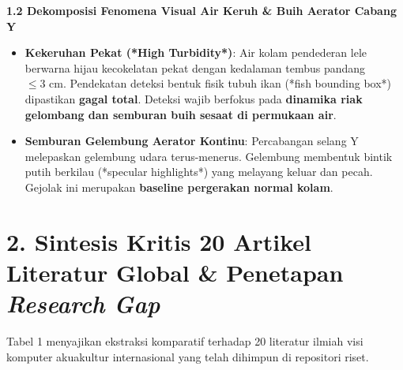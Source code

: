\documentclass[10pt,a4paper]{article}
\providecommand{\text}[1]{\mbox{#1}}
\begin{document}
\textbf{1.2 Dekomposisi Fenomena Visual Air Keruh \& Buih Aerator Cabang Y}
\begin{itemize}\setlength{\itemsep}{0.5pt}\setlength{\parskip}{0pt}
    \item \textbf{Kekeruhan Pekat (*High Turbidity*)}: Air kolam pendederan lele berwarna hijau kecokelatan pekat dengan kedalaman tembus pandang $\le 3\text{ cm}$. Pendekatan deteksi bentuk fisik tubuh ikan (*fish bounding box*) dipastikan \textbf{gagal total}. Deteksi wajib berfokus pada \textbf{dinamika riak gelombang dan semburan buih sesaat di permukaan air}.
    \item \textbf{Semburan Gelembung Aerator Kontinu}: Percabangan selang Y melepaskan gelembung udara terus-menerus. Gelembung membentuk bintik putih berkilau (*specular highlights*) yang melayang keluar dan pecah. Gejolak ini merupakan \textbf{baseline pergerakan normal kolam}.
\end{itemize}

\newpage

\section*{2. Sintesis Kritis 20 Artikel Literatur Global \& Penetapan \textit{Research Gap}}

Tabel 1 menyajikan ekstraksi komparatif terhadap 20 literatur ilmiah visi komputer akuakultur internasional yang telah dihimpun di repositori riset.
\end{document}
